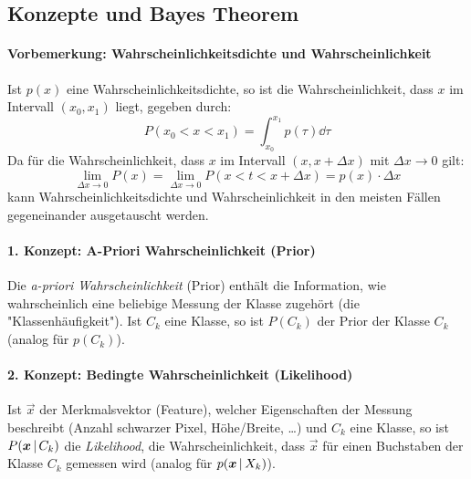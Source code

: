 		\subsection{Konzepte und Bayes Theorem}
			\paragraph{Vorbemerkung: Wahrscheinlichkeitsdichte und Wahrscheinlichkeit}
				Ist \( p(x) \) eine Wahrscheinlichkeitsdichte, so ist die Wahrscheinlichkeit, dass \(x\) im Intervall \( (x_0, x_1) \) liegt, gegeben durch:
				\begin{equation*}
					P(x_0 < x < x_1) = \int_{x_0}^{x_1} \! p(\tau) \dd{\tau}
				\end{equation*}
				Da für die Wahrscheinlichkeit, dass \( x \) im Intervall \( (x, x + \Delta x) \) mit \( \Delta x \to 0 \) gilt:
				\begin{equation*}
					\lim\limits_{\Delta x \to 0} P(x) = \lim\limits_{\Delta x \to 0} P(x < t < x + \Delta x) = p(x) \cdot \Delta x
				\end{equation*}
				kann Wahrscheinlichkeitsdichte und Wahrscheinlichkeit in den meisten Fällen gegeneinander ausgetauscht werden.

			\paragraph{1. Konzept: A-Priori Wahrscheinlichkeit (Prior)}
				Die \emph{a-priori Wahrscheinlichkeit} (Prior) enthält die Information, wie wahrscheinlich eine beliebige Messung der Klasse zugehört (\dh die "Klassenhäufigkeit"). Ist \( C_k \) eine Klasse, so ist \( P(C_k) \) der Prior \bzgl der Klasse \( C_k \) (analog für \( p(C_k) \)).

			\paragraph{2. Konzept: Bedingte Wahrscheinlichkeit (Likelihood)}
				Ist \(\vec{x}\) der Merkmalsvektor (Feature), welcher Eigenschaften der Messung beschreibt (Anzahl schwarzer Pixel, Höhe/Breite, \dots) und \( C_k \) eine Klasse, so ist \( P(\bm{x} \,\vert\, C_k) \) die \emph{Likelihood}, \dh die Wahrscheinlichkeit, dass \(\vec{x}\) für einen Buchstaben der Klasse \( C_k \) gemessen wird (analog für \( p(\bm{x} \,\vert\, X_k) \)).

